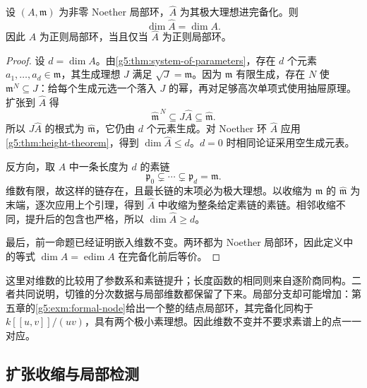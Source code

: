 \begin{theorem}\label{g5:thm:completion-dimension}
	设 \((A,\mathfrak m)\) 为非零 Noether 局部环，\(\widehat A\) 为其极大理想进完备化。则
	\[
		\dim\widehat A=\dim A.
	\]
	因此 \(A\) 为正则局部环，当且仅当 \(\widehat A\) 为正则局部环。
\end{theorem}
\begin{proof}
	设 \(d=\dim A\)。由\cref{g5:thm:system-of-parameters}，存在 \(d\) 个元素 \(a_1,\ldots,a_d\in\mathfrak m\)，其生成理想 \(J\) 满足 \(\sqrt J=\mathfrak m\)。因为 \(\mathfrak m\) 有限生成，存在 \(N\) 使 \(\mathfrak m^N\subseteq J\)：给每个生成元选一个落入 \(J\) 的幂，再对足够高次单项式使用抽屉原理。扩张到 \(\widehat A\) 得
	\[
		\widehat{\mathfrak m}^{\,N}
		\subseteq J\widehat A\subseteq\widehat{\mathfrak m}.
	\]
	所以 \(J\widehat A\) 的根式为 \(\widehat{\mathfrak m}\)，它仍由 \(d\) 个元素生成。对 Noether 环 \(\widehat A\) 应用\cref{g5:thm:height-theorem}，得到 \(\dim\widehat A\leq d\)。\(d=0\) 时相同论证采用空生成元表。

	反方向，取 \(A\) 中一条长度为 \(d\) 的素链
	\[
		\mathfrak p_0\subsetneq\cdots\subsetneq\mathfrak p_d=\mathfrak m.
	\]
	维数有限，故这样的链存在，且最长链的末项必为极大理想。以收缩为 \(\mathfrak m\) 的 \(\widehat{\mathfrak m}\) 为末端，逐次应用上个引理，得到 \(\widehat A\) 中收缩为整条给定素链的素链。相邻收缩不同，提升后的包含也严格，所以 \(\dim\widehat A\geq d\)。

	最后，前一命题已经证明嵌入维数不变。两环都为 Noether 局部环，因此定义中的等式 \(\dim A=\operatorname{edim}A\) 在完备化前后等价。
\end{proof}

这里对维数的比较用了参数系和素链提升；长度函数的相同则来自逐阶商同构。二者共同说明，切锥的分次数据与局部维数都保留了下来。局部分支却可能增加：第五章的\cref{g5:exm:formal-node}给出一个整的结点局部环，其完备化同构于 \(k[[u,v]]/(uv)\)，具有两个极小素理想。因此维数不变并不要求素谱上的点一一对应。

\subsection{扩张收缩与局部检测}
\label{g5:subsec:0704:04}


